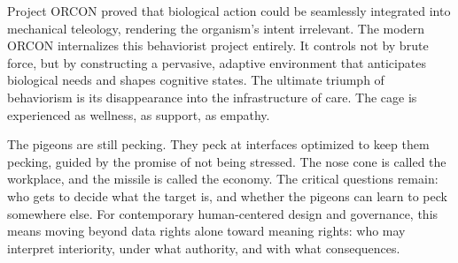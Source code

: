 \documentclass[11pt, a4paper]{article}
\begin{document}
Project ORCON proved that biological action could be seamlessly integrated into mechanical teleology, rendering the organism's intent irrelevant. The modern ORCON internalizes this behaviorist project entirely. It controls not by brute force, but by constructing a pervasive, adaptive environment that anticipates biological needs and shapes cognitive states. The ultimate triumph of behaviorism is its disappearance into the infrastructure of care. The cage is experienced as wellness, as support, as empathy.

The pigeons are still pecking. They peck at interfaces optimized to keep them pecking, guided by the promise of not being stressed. The nose cone is called the workplace, and the missile is called the economy. The critical questions remain: who gets to decide what the target is, and whether the pigeons can learn to peck somewhere else. For contemporary human-centered design and governance, this means moving beyond data rights alone toward meaning rights: who may interpret interiority, under what authority, and with what consequences.
\end{document}
